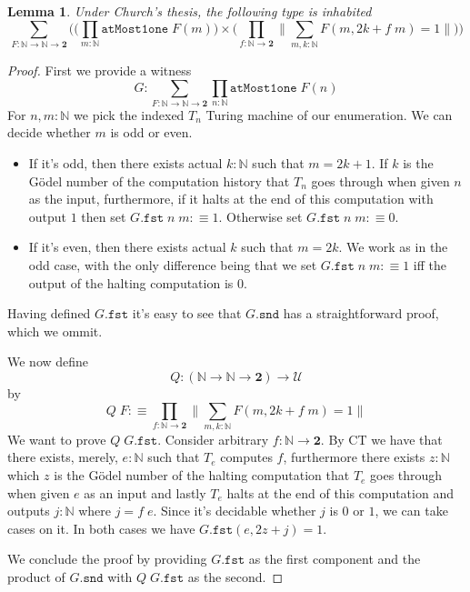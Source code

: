 \documentclass[12pt]{report}
\newtheorem{lem}[thm]{Lemma}
\theoremstyle{definition}
\begin{document}
\begin{lem}\label{405}
Under Church's thesis, the following type is inhabited
$$\sum_{F : \mathbb{N} \rightarrow \mathbb{N} \rightarrow \mathbf{2}} \Big( \big(\prod_{m : \mathbb{N}} \mathtt{atMost1one}\; F(m) \big) \times \big( \prod_{f : \mathbb{N} \rightarrow \mathbf{2}} \big\lVert \sum_{m, k : \mathbb{N}} F(m, 2k+ f\; m) = 1 \big\rVert \big) \Big)$$
\end{lem}
\begin{proof}
First we provide a witness
$$G : \sum_{F : \mathbb{N} \rightarrow \mathbb{N} \rightarrow \mathbf{2} } \prod_{n : \mathbb{N}}\mathtt{atMost1one}\; F(n)$$
For $n, m : \mathbb{N}$ we pick the indexed $T_n$ Turing machine of our enumeration. 
We can decide whether $m$ is odd or even. 
\begin{itemize}
\item If it's odd, then there exists actual $k : \mathbb{N}$ such that $m = 2k +1$. 
If $k$ is the G\"odel number of the computation history that $T_n$ goes through when given $n$ as the input, furthermore, if it halts at the end of this computation with output $1$ then set $G.\mathtt{fst}\; n\; m :\equiv 1$. 
Otherwise set $G.\mathtt{fst}\; n\; m :\equiv 0$.
\item If it's even, then there exists actual $k$ such that $m = 2k$. 
We work as in the odd case, with the only difference being that we set $G.\mathtt{fst}\; n\; m :\equiv 1$ iff the output of the halting computation is $0$.
\end{itemize}
Having defined $G.\mathtt{fst}$ it's easy to see that $G.\mathtt{snd}$ has a straightforward proof, which we ommit. 

We now define 
$$Q : (\mathbb{N} \rightarrow \mathbb{N} \rightarrow \mathbf{2}) \rightarrow \mathcal{U}$$ 
by 
$$Q\; F :\equiv \prod_{f : \mathbb{N} \rightarrow \mathbf{2}} \big\lVert \sum_{m, k : \mathbb{N}} F(m, 2k+ f\; m) = 1 \big\rVert$$
We want to prove $Q\; G.\mathtt{fst}$. 
Consider arbitrary $f : \mathbb{N} \rightarrow \mathbf{2}$. 
By CT we have that there exists, merely, $e : \mathbb{N}$ such that $T_e$ computes $f$, furthermore there exists $z : \mathbb{N}$ which $z$ is the G\"odel number of the halting computation that $T_e$ goes through when given $e$ as an input and lastly $T_e$ halts at the end of this computation and outputs $j : \mathbb{N}$ where $j = f\; e$. 
Since it's decidable whether $j$ is $0$ or $1$, we can take cases on it.
In both cases we have $G.\mathtt{fst} (e, 2z + j) = 1$. 

We conclude the proof by providing $G.\mathtt{fst}$ as the first component and the product of $G.\mathtt{snd}$ with $Q\; G.\mathtt{fst}$ as the second.
\end{proof}
\end{document}
